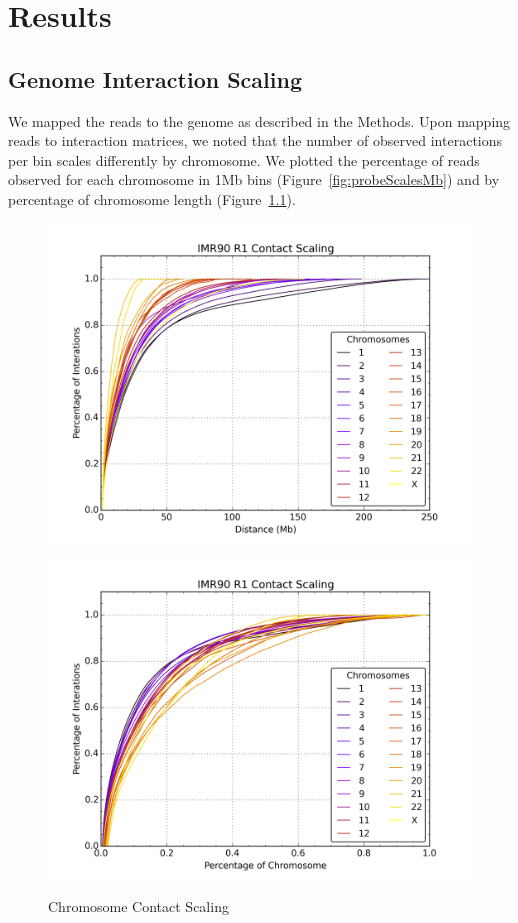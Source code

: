 \chapter{Results}

\section*{Genome Interaction Scaling}
We mapped the reads to the genome as described in the Methods.  Upon mapping reads to interaction matrices, we noted that the number
of observed interactions per bin scales differently by chromosome.  We plotted the percentage of reads observed for each chromosome
in 1Mb bins (Figure~\ref{fig:probeScalesMb}) and by percentage of chromosome length (Figure~\ref{fig:probeScalesPercent}).

\begin{figure}[H]
  \caption{Chromosome Contact Scaling}
  \noindent%
  \begin{minipage}[b]{0.5\textwidth}\label{fig:probeScalesMb}
    \includegraphics[width=\linewidth]{./figures/results/probeScalesMb.png}
  \end{minipage}%
  \hfill
  \begin{minipage}[b]{0.5\linewidth}\label{fig:probeScalesPercent}
    \includegraphics[width=\textwidth]{./figures/results/probeScalesPercent.png}

\end{minipage}
\end{figure}
